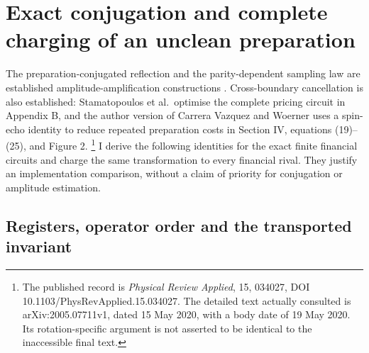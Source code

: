 \section{Exact conjugation and complete charging of an unclean preparation}
\label{app:cancellation-aware-preparation}

The preparation-conjugated reflection and the parity-dependent sampling
law are established amplitude-amplification constructions
\citep{suzuki2020,rallfuller2023}. Cross-boundary cancellation is also
established: Stamatopoulos et al.\ optimise the complete pricing circuit
in Appendix B, and the author version of Carrera Vazquez and Woerner
uses a spin-echo identity to reduce repeated preparation costs in
Section IV, equations (19)--(25), and Figure 2.
\footnote{The published record is \emph{Physical Review Applied}, 15,
034027, DOI 10.1103/PhysRevApplied.15.034027. The detailed text actually
consulted is arXiv:2005.07711v1, dated 15 May 2020, with a body date of
19 May 2020. Its rotation-specific argument is not asserted to be
identical to the inaccessible final text.}
I derive the following identities for the exact finite financial
circuits and charge the same transformation to every financial rival.
They justify an implementation comparison, without a claim of priority
for conjugation or amplitude estimation.

\subsection{Registers, operator order and the transported invariant}

